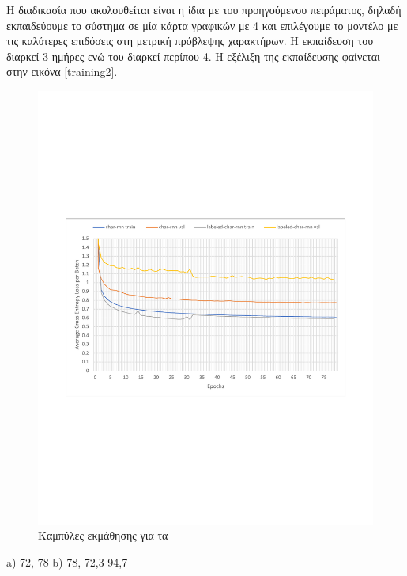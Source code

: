 Η διαδικασία που ακολουθείται είναι η ίδια με του προηγούμενου πειράματος, δηλαδή εκπαιδεύουμε το σύστημα σε μία κάρτα γραφικών  με 4  και επιλέγουμε το μοντέλο με τις καλύτερες επιδόσεις στη μετρική πρόβλεψης χαρακτήρων.
Η εκπαίδευση του  διαρκεί 3 ημήρες ενώ του  διαρκεί περίπου 4. Η εξέλιξη της εκπαίδευσης φαίνεται στην εικόνα \ref{training2}.

\begin{figure}[h]
	\includegraphics[width=\textwidth, trim = 25 220 25 220, clip, keepaspectratio]{images/training2.pdf}
	\centering
	\caption{Καμπύλες εκμάθησης για τα }
	\label{training1}
\end{figure}

a) 72, 78%
b) 78, 72,3 94,7%